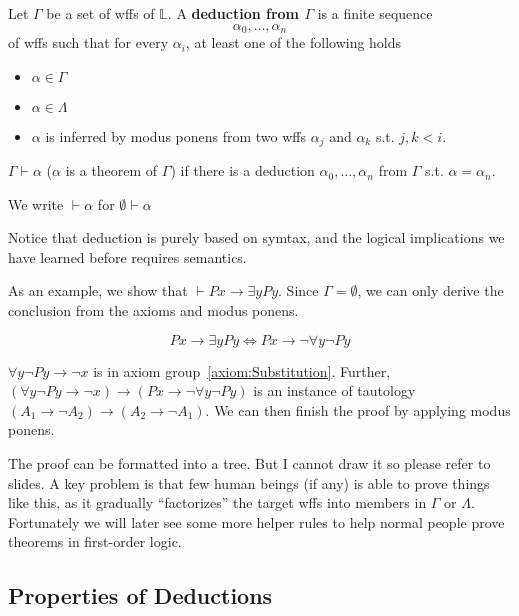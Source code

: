 \begin{definition}[Deduction]
    Let $\Gamma$ be a set of wffs of $\mathbb{L}$. A \textbf{deduction from $\Gamma$} is a finite sequence
    \[ \alpha_0,\dots,\alpha_n \]
    of wffs such that for every $\alpha_i$, at least one of the following holds
    \begin{itemize}
        \item $\alpha\in\Gamma$
        \item $\alpha\in\Lambda$
        \item $\alpha$ is inferred by modus ponens from two wffs $\alpha_j$ and $\alpha_k$ s.t. $j,k < i$.
    \end{itemize}
\end{definition}

\begin{definition}
    $\Gamma\vdash\alpha$ ($\alpha$ is a theorem of $\Gamma$) if there is a deduction $\alpha_0,\dots,\alpha_n$ from $\Gamma$ s.t. $\alpha=\alpha_n$.

    We write $\vdash\alpha$ for $\emptyset\vdash\alpha$
\end{definition}

Notice that deduction is purely based on symtax, and the logical implications we have learned before requires semantics.

As an example, we show that $\vdash Px \to \exists yPy$. Since $\Gamma = \emptyset$, we can only derive the conclusion from the axioms and modus ponens.

\[ Px \to \exists yPy \iff Px \to \neg\forall y \neg Py \]

$\forall y \neg Py \to \neg x$ is in axiom group~\ref{axiom:Substitution}. Further, $(\forall y \neg Py \to \neg x) \to (Px \to \neg \forall y \neg Py)$ is an instance of tautology $(A_1 \to \neg A_2) \to (A_2 \to \neg A_1)$. We can then finish the proof by applying modus ponens.

The proof can be formatted into a tree. But I cannot draw it so please refer to slides. A key problem is that few human beings (if any) is able to prove things like this, as it gradually ``factorizes'' the target wffs into members in $\Gamma$ or $\Lambda$. Fortunately we will later see some more helper rules to help normal people prove theorems in first-order logic.

\subsection{Properties of Deductions}

